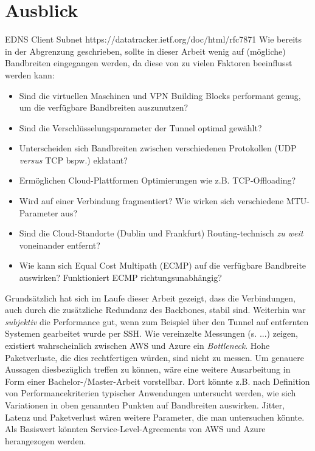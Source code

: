 \section{Ausblick}\label{ausblick}
EDNS Client Subnet https://datatracker.ietf.org/doc/html/rfc7871
Wie bereits in der Abgrenzung geschrieben, sollte in dieser Arbeit wenig auf (mögliche) Bandbreiten eingegangen werden, da diese von zu vielen Faktoren beeinflusst werden kann:
\begin{itemize}
    \item Sind die virtuellen Maschinen und VPN Building Blocks performant genug, um die verfügbare Bandbreiten auszunutzen?
    \item Sind die Verschlüsselungsparameter der Tunnel optimal gewählt?
    \item Unterscheiden sich Bandbreiten zwischen verschiedenen Protokollen (UDP \textit{versus} TCP bspw.) eklatant?
    \item Ermöglichen Cloud-Plattformen Optimierungen wie z.B. TCP-Offloading?
    \item Wird auf einer Verbindung fragmentiert? Wie wirken sich verschiedene MTU-Parameter aus?
    \item Sind die Cloud-Standorte (Dublin und Frankfurt) Routing-technisch \textit{zu weit} voneinander entfernt?
    \item Wie kann sich Equal Cost Multipath (ECMP) auf die verfügbare Bandbreite auswirken? Funktioniert ECMP richtungsunabhängig?
\end{itemize}
Grundsätzlich hat sich im Laufe dieser Arbeit gezeigt, dass die Verbindungen, auch durch die zusätzliche Redundanz des Backbones, stabil sind. Weiterhin war \textit{subjektiv} die Performance gut, wenn zum Beispiel über den Tunnel auf entfernten Systemen gearbeitet wurde per SSH. Wie vereinzelte Messungen (s. ...) zeigen, existiert wahrscheinlich zwischen AWS und Azure ein \textit{Bottleneck}. Hohe Paketverluste, die dies rechtfertigen würden, sind nicht zu messen.
Um genauere Aussagen diesbezüglich treffen zu können, wäre eine weitere Ausarbeitung in Form einer Bachelor-/Master-Arbeit vorstellbar. Dort könnte z.B. nach Definition von Performancekriterien typischer Anwendungen untersucht werden, wie sich Variationen in oben genannten Punkten auf Bandbreiten auswirken. Jitter, Latenz und Paketverlust wären weitere Parameter, die man untersuchen könnte. Als Basiswert könnten Service-Level-Agreements von AWS und Azure herangezogen werden.\\
